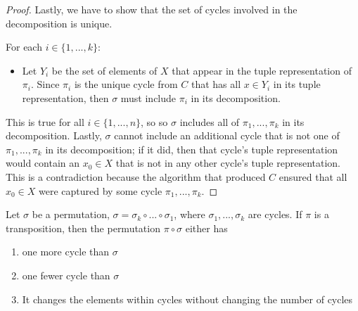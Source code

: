 \begin{proof}
    \vspace{.5cm}

    \newcommand{\tpi}{\widetilde{\pi}}

    Lastly, we have to show that the set of cycles involved in the decomposition is unique.

    For each $i \in \{1, ..., k\}$:
    
    \begin{itemize}
        \item Let $Y_i$ be the set of elements of $X$ that appear in the tuple representation of $\pi_i$. Since $\pi_i$ is the unique cycle from $C$ that has all $x \in Y_i$ in its tuple representation, then $\sigma$ must include $\pi_i$ in its decomposition.
    \end{itemize}
    
    This is true for all $i \in \{1, ..., n\}$, so so $\sigma$ includes all of $\pi_1, ..., \pi_k$ in its decomposition. Lastly, $\sigma$ cannot include an additional cycle that is not one of $\pi_1, ..., \pi_k$ in its decomposition; if it did, then that cycle's tuple representation would contain an $x_0 \in X$ that is not in any other cycle's tuple representation. This is a contradiction because the algorithm that produced $C$ ensured that all $x_0 \in X$ were captured by some cycle $\pi_1, ..., \pi_k$.
\end{proof}

\begin{lemma}
    Let $\sigma$ be a permutation, $\sigma = \sigma_k \circ ... \circ \sigma_1$, where $\sigma_1, ..., \sigma_k$ are cycles. If $\pi$ is a transposition, then the permutation $\pi \circ \sigma$ either has

    \begin{enumerate}
        \item one more cycle than $\sigma$
        \item one fewer cycle than $\sigma$
        \item It changes the elements within cycles without changing the number of cycles
    \end{enumerate}
\end{lemma}

